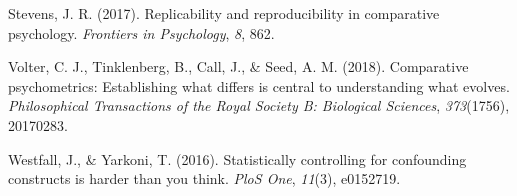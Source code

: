 \documentclass[10pt, letterpaper]{article}
\begin{document}
\leavevmode\hypertarget{ref-stevens2017replicability}{}%
Stevens, J. R. (2017). Replicability and reproducibility in comparative
psychology. \emph{Frontiers in Psychology}, \emph{8}, 862.

\leavevmode\hypertarget{ref-volter2018comparative}{}%
Volter, C. J., Tinklenberg, B., Call, J., \& Seed, A. M. (2018).
Comparative psychometrics: Establishing what differs is central to
understanding what evolves. \emph{Philosophical Transactions of the
Royal Society B: Biological Sciences}, \emph{373}(1756), 20170283.

\leavevmode\hypertarget{ref-westfall2016statistically}{}%
Westfall, J., \& Yarkoni, T. (2016). Statistically controlling for
confounding constructs is harder than you think. \emph{PloS One},
\emph{11}(3), e0152719.




\end{document}
